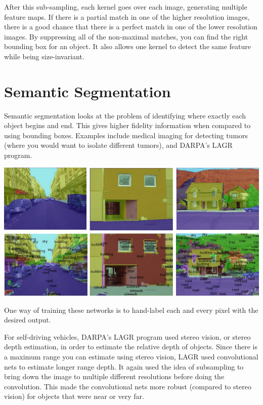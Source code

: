After this sub-sampling, each kernel goes over each image, generating multiple feature maps.
If there is a partial match in one of the higher resolution images, there is a good chance that there is a perfect match in one of the lower resolution images.
By suppressing all of the non-maximal matches, you can find the right bounding box for an object.
It also allows one kernel to detect the same feature while being size-invariant.

\section{Semantic Segmentation}
Semantic segmentation looks at the problem of identifying where exactly each object begins and end.
This gives higher fidelity information when compared to using bounding boxes.
Examples include medical imaging for detecting tumors (where you would want to isolate different tumors), and DARPA's LAGR program.

\begin{center}
	\includegraphics[width=0.8\linewidth]{lectures/04-a/images/semantic-segmentation.png}
\end{center}

One way of training these networks is to hand-label each and every pixel with the desired output.

For self-driving vehicles, DARPA's LAGR program used stereo vision, or stereo depth estimation, in order to estimate the relative depth of objects.
Since there is a maximum range you can estimate using stereo vision, LAGR used convolutional nets to estimate longer range depth.
It again used the idea of subsampling to bring down the image to multiple different resolutions before doing the convolution.
This made the convolutional nets more robust (compared to stereo vision) for objects that were near or very far.